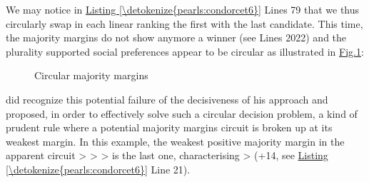 \documentclass[a4paper,12pt,english]{sphinxhowto}
\let\sphinxpxdimen\pdfpxdimen\else\newdimen\sphinxpxdimen
\begin{document}
\sphinxAtStartPar
We may notice in \hyperref[\detokenize{pearls:condorcet6}]{Listing \ref{\detokenize{pearls:condorcet6}}} Lines 7\sphinxhyphen{}9 that we thus circularly swap in each linear ranking the first with the last candidate. This time, the majority margins do not show anymore a  winner (see Lines 20\sphinxhyphen{}22) and the plurality supported social preferences appear to be circular as illustrated in \hyperref[\detokenize{pearls:condorcet7}]{Fig.\@ \ref{\detokenize{pearls:condorcet7}}}:

\begin{sphinxVerbatim}[commandchars=\\\{\},numbers=left,firstnumber=1,stepnumber=1]
\end{sphinxVerbatim}

\begin{figure}[H]
\centering
\capstart

\noindent\sphinxincludegraphics[width=250\sphinxpxdimen]{{circularPreference}.png}
\caption{Circular majority margins}\label{\detokenize{pearls:condorcet7}}\end{figure}

\sphinxAtStartPar
{} did recognize this potential failure of the decisiveness of his approach and proposed, in order to effectively solve such a circular decision problem, a kind of prudent  rule where a potential majority margins circuit is broken up at its weakest margin. In this example, the weakest positive majority margin in the apparent circuit \textendash{} \textgreater{}  \textgreater{}  \textgreater{} \textendash{}  is the last one, characterising  \textgreater{}  (+14, see \hyperref[\detokenize{pearls:condorcet6}]{Listing \ref{\detokenize{pearls:condorcet6}}} Line 21).
\end{document}
